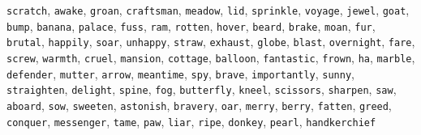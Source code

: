 \verb|scratch|, \verb|awake|, \verb|groan|, \verb|craftsman|, \verb|meadow|, \verb|lid|, \verb|sprinkle|, \verb|voyage|, \verb|jewel|, \verb|goat|, \verb|bump|, \verb|banana|, \verb|palace|, \verb|fuss|, \verb|ram|, \verb|rotten|, \verb|hover|, \verb|beard|, \verb|brake|, \verb|moan|, \verb|fur|, \verb|brutal|, \verb|happily|, \verb|soar|, \verb|unhappy|, \verb|straw|, \verb|exhaust|, \verb|globe|, \verb|blast|, \verb|overnight|, \verb|fare|, \verb|screw|, \verb|warmth|, \verb|cruel|, \verb|mansion|, \verb|cottage|, \verb|balloon|, \verb|fantastic|, \verb|frown|, \verb|ha|, \verb|marble|, \verb|defender|, \verb|mutter|, \verb|arrow|, \verb|meantime|, \verb|spy|, \verb|brave|, \verb|importantly|, \verb|sunny|, \verb|straighten|, \verb|delight|, \verb|spine|, \verb|fog|, \verb|butterfly|, \verb|kneel|, \verb|scissors|, \verb|sharpen|, \verb|saw|, \verb|aboard|, \verb|sow|, \verb|sweeten|, \verb|astonish|, \verb|bravery|, \verb|oar|, \verb|merry|, \verb|berry|, \verb|fatten|, \verb|greed|, \verb|conquer|, \verb|messenger|, \verb|tame|, \verb|paw|, \verb|liar|, \verb|ripe|, \verb|donkey|, \verb|pearl|, \verb|handkerchief|